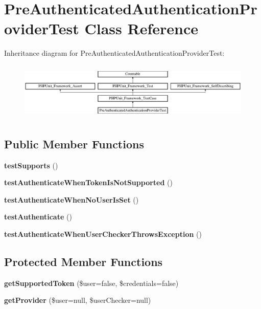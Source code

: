 \section{Pre\+Authenticated\+Authentication\+Provider\+Test Class Reference}
\label{class_symfony_1_1_component_1_1_security_1_1_core_1_1_tests_1_1_authentication_1_1_provider_1_1_4d5e723c13cbdaccdadb2f639b357972}
Inheritance diagram for Pre\+Authenticated\+Authentication\+Provider\+Test\+:\begin{figure}[H]
\begin{center}
\leavevmode
\includegraphics[height=2.775713cm]{class_symfony_1_1_component_1_1_security_1_1_core_1_1_tests_1_1_authentication_1_1_provider_1_1_4d5e723c13cbdaccdadb2f639b357972}
\end{center}
\end{figure}
\subsection*{Public Member Functions}
\begin{DoxyCompactItemize}
\item 
{\bf test\+Supports} ()
\item 
{\bf test\+Authenticate\+When\+Token\+Is\+Not\+Supported} ()
\item 
{\bf test\+Authenticate\+When\+No\+User\+Is\+Set} ()
\item 
{\bf test\+Authenticate} ()
\item 
{\bf test\+Authenticate\+When\+User\+Checker\+Throws\+Exception} ()
\end{DoxyCompactItemize}
\subsection*{Protected Member Functions}
\begin{DoxyCompactItemize}
\item 
{\bf get\+Supported\+Token} (\$user=false, \$credentials=false)
\item 
{\bf get\+Provider} (\$user=null, \$user\+Checker=null)
\end{DoxyCompactItemize}
